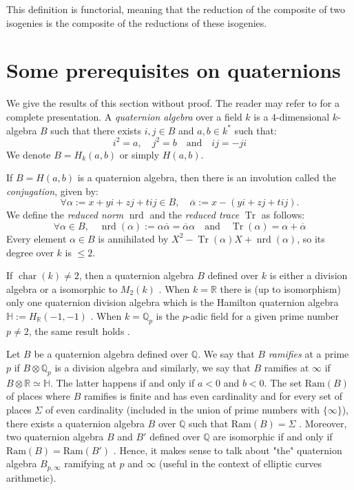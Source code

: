 \documentclass[a4paper,10pt,notitlepage]{report}
\theoremstyle{definition}
\theoremstyle{plain}
\theoremstyle{definition}
\newcommand{\Q}{\mathbb{Q}}
\newcommand{\R}{\mathbb{R}}
\renewcommand{\(}{\left(}
\renewcommand{\)}{\right)}
\DeclareMathOperator{\Tr}{Tr}
\DeclareMathOperator{\nrd}{nrd}
\DeclareMathOperator{\Char}{char}%
\begin{document}
This definition is functorial,  meaning that the reduction of the composite of two isogenies is the composite of the reductions of these isogenies.  

\section{Some prerequisites on quaternions}\label{Paragraph 24}

We give the results of this section without proof. The reader may refer to \cite{Voight} for a complete presentation. A \emph{quaternion algebra} over a field $k$ is a $4$-dimensional $k$-algebra $B$ such that there exists $i, j\in B$ and $a, b\in k^*$ such that:
\[i^2=a, \quad j^2=b \quad \mbox{and} \quad ij=-ji\]
We denote $B=H_k(a,b)$ or simply $H(a,b)$.

If $B=H(a,b)$ is a quaternion algebra, then there is an involution called the \emph{conjugation}, given by:
\[\forall \alpha:=x+yi+zj+tij\in B, \quad \overline{\alpha}:=x-(yi+zj+tij).\] 
We define the \emph{reduced norm} $\nrd$ and the \emph{reduced trace} $\Tr$ as follows:
\[\forall \alpha\in B, \quad \nrd(\alpha):=\alpha \overline{\alpha}=\overline{\alpha}\alpha \quad \mbox{and} \quad \Tr(\alpha)=\alpha+\overline{\alpha}\]
Every element $\alpha\in B$ is annihilated by $X^2-\Tr(\alpha)X+\nrd(\alpha)$, so its degree over $k$ is $\leq 2$.

If $\Char(k)\neq 2$, then a quaternion algebra $B$ defined over $k$ is either a division algebra or a isomorphic to $M_2(k)$ \cite[Theorem 5.4.4]{Voight}. When $k=\R$ there is (up to isomorphism) only one quaternion division algebra which is the Hamilton quaternion algebra $\mathbb{H}:=H_{\R}(-1,-1)$ \cite[Corollary 3.5.8]{Voight}. When $k=\Q_p$ is the $p$-adic field for a given prime number $p\neq 2$, the same result holds \cite[Theorem 12.1.5]{Voight}.

Let $B$ be a quaternion algebra defined over $\Q$. We say that $B$ \emph{ramifies} at a prime $p$ if $B\otimes\Q_p$ is a division algebra and similarly, we say that $B$ ramifies at $\infty$ if $B\otimes\R\simeq \mathbb{H}$.  The latter happens if and only if $a<0$ and $b<0$. The set $\mbox{Ram}(B)$ of places where $B$ ramifies is finite and has even cardinality \cite[Proposition 14.2.1]{Voight} and for every set of places $\Sigma$ of even cardinality (included in the union of prime numbers with $\{\infty\}$), there exists a quaternion algebra $B$ over $\Q$ such that $\mbox{Ram}(B)=\Sigma$ \cite[Proposition 14.2.7]{Voight}.  Moreover, two quaternion algebra $B$ and $B'$ defined over $\Q$ are isomorphic if and only if $\mbox{Ram}(B)=\mbox{Ram}(B')$ \cite[Proposition 14.3.1]{Voight}. Hence, it makes sense to talk about "the" quaternion algebra $B_{p,\infty}$ ramifying at $p$ and $\infty$ (useful in the context of elliptic curves arithmetic).
\end{document}
